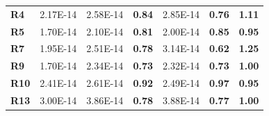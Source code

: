 \documentclass[encoding=utf8,british]{tumphthesis}
\begin{document}
\begin{table}[H]
\begin{subtable}{1.0\textwidth}
{\begin{tabular}{|l|llr|lr|r|}
\rowcolor[HTML]{CFE2F3} 
\textbf{R4}                               & 2.17E-14                                             & 2.58E-14                                              & \textbf{0.84}                                    & 2.85E-14                                                       & \textbf{0.76}                                    & \textbf{1.11}                                            \\
\textbf{R5}                               & 1.70E-14                                             & 2.10E-14                                              & \textbf{0.81}                                    & 2.00E-14                                                       & \textbf{0.85}                                    & \textbf{0.95}                                            \\
\rowcolor[HTML]{CFE2F3} 
\textbf{R7}                               & 1.95E-14                                             & 2.51E-14                                              & \textbf{0.78}                                    & 3.14E-14                                                       & \textbf{0.62}                                    & \textbf{1.25}                                            \\
\textbf{R9}                               & 1.70E-14                                             & 2.34E-14                                              & \textbf{0.73}                                    & 2.32E-14                                                       & \textbf{0.73}                                    & \textbf{1.00}                                            \\
\rowcolor[HTML]{CFE2F3} 
\textbf{R10}                              & 2.41E-14                                             & 2.61E-14                                              & \textbf{0.92}                                    & 2.49E-14                                                       & \textbf{0.97}                                    & \textbf{0.95}                                            \\
\textbf{R13}                              & 3.00E-14                                             & 3.86E-14                                              & \textbf{0.78}                                    & 3.88E-14                                                       & \textbf{0.77}                                    & \textbf{1.00}                                            \\

\end{tabular}}
\end{subtable}
\end{table}
\end{document}
